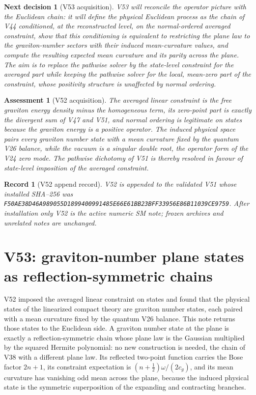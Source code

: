\documentclass[11pt]{article}
\newtheorem{decision}[theorem]{Next decision}
\newtheorem{assessment}[theorem]{Assessment}
\newtheorem{record}[theorem]{Record}
\theoremstyle{remark}
\begin{document}
\begin{decision}[V53 acquisition]
\label{dec:v19v52-next}
V53 will reconcile the operator picture with the Euclidean chain: it
will define the physical Euclidean process as the chain of V44
conditioned, at the reconstructed level, on the normal-ordered averaged
constraint, show that this conditioning is equivalent to restricting
the plane law to the graviton-number sectors with their induced
mean-curvature values, and compute the resulting expected mean
curvature and its parity across the plane.  The aim is to replace the
pathwise solver by the state-level constraint for the averaged part
while keeping the pathwise solver for the local, mean-zero part of the
constraint, whose positivity structure is unaffected by normal
ordering.
\end{decision}

\begin{assessment}[V52 acquisition]
\label{ass:v19v52}
The averaged linear constraint is the free graviton energy density
minus the homogeneous term, its zero-point part is exactly the
divergent sum of V47 and V51, and normal ordering is legitimate on
states because the graviton energy is a positive operator.  The
induced physical space pairs every graviton number state with a mean
curvature fixed by the quantum V26 balance, while the vacuum is a
singular double root, the operator form of the V24 zero mode.  The
pathwise dichotomy of V51 is thereby resolved in favour of state-level
imposition of the averaged constraint.
\end{assessment}

\begin{record}[V52 append record]
\label{rec:v19v52}
V52 is appended to the validated V51 whose installed SHA--256 was
\texttt{F50AE38D46A989055D1899400991485E66E61BB23BFF33956E86B11039CE9759}.
After installation only V52 is the active numeric SM note; frozen
archives and unrelated notes are unchanged.
\end{record}


\section{V53: graviton-number plane states as reflection-symmetric chains}
\label{sec:v19v53}

V52 imposed the averaged linear constraint on states and found that the
physical states of the linearized compact theory are graviton number
states, each paired with a mean curvature fixed by the quantum V26
balance.  This note returns those states to the Euclidean side.  A
graviton number state at the plane is exactly a reflection-symmetric
chain whose plane law is the Gaussian multiplied by the squared Hermite
polynomial: no new construction is needed, the chain of V38 with a
different plane law.  Its reflected two-point function carries the Bose
factor \(2n+1\), its constraint expectation is
\((n+\tfrac12)\omega/(2c_g)\), and its mean curvature has vanishing
odd mean across the plane, because the induced physical state is the
symmetric superposition of the expanding and contracting branches.
\end{document}
